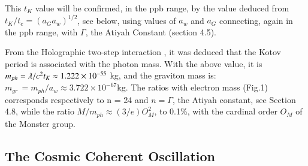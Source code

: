 \documentclass[twoside,draft]{article}
\begin{document}
\begin{sloppypar}
This $t_K$ value will be confirmed, in the ppb range, by the value
deduced from $t_{K} /t_{e} = (a_{G} a_{w})^{1/2}$, see below, using values of $a_{w}$ and $a_{G}$ connecting, again in the ppb
range, with $\Gamma$, the Atiyah Constant (section 4.5).

From the Holographic two-step interaction \cite{Sanchez1}, it was deduced that the Kotov period is
associated with the photon mass. With the above value, it is $m_{ph} = \lambdabar/c^{2} t_{K} \approx 1.222 \times 10^{-55}$ kg, and the graviton mass is: 
$m_{gr}\, = m_{ph} /a_{w} \approx 3.722 \times 10^{-67} $kg.
The ratios with electron mass (Fig.1) corresponds respectively to n = 24 and $n = \Gamma$, the Atiyah constant, see Section 4.8, while the ratio $M/m_{ph} \approx (3/e)O^2_M$, to 0.1\%, with the cardinal order $O_M$ of the Monster group.

\subsection{The Cosmic Coherent Oscillation}


\end{sloppypar}
\end{document}
